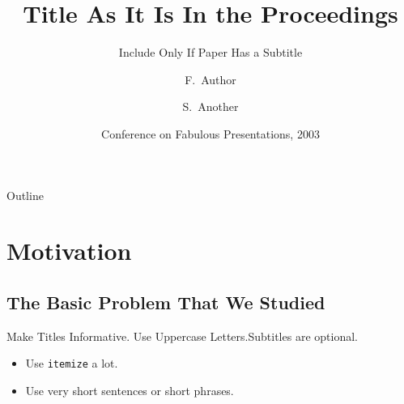 \documentclass{article}
\title[Short Paper Title] %
{Title As It Is In the Proceedings}
\subtitle
{Include Only If Paper Has a Subtitle}
\author[Author, Another] %
{F.~Author\inst{1} \and S.~Another\inst{2}}
\institute[Universities of Somewhere and Elsewhere] %
{
  \inst{1}%
  Department of Computer Science\\
  University of Somewhere
  \and
  \inst{2}%
  Department of Theoretical Philosophy\\
  University of Elsewhere}
\date[CFP 2003] %
{Conference on Fabulous Presentations, 2003}
\begin{document}
\begin{frame}
  \titlepage
\end{frame}

\begin{frame}{Outline}
  \tableofcontents
\end{frame}





\section{Motivation}

\subsection{The Basic Problem That We Studied}

\begin{frame}{Make Titles Informative. Use Uppercase Letters.}{Subtitles are optional.}

  \begin{itemize}
  \item
    Use \texttt{itemize} a lot.
  \item
    Use very short sentences or short phrases.
  \end{itemize}
\end{frame}
\end{document}
